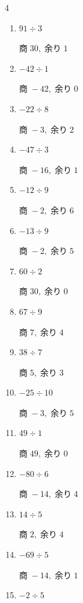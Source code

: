 \begin{multicols}{4}
\begin{enumerate}
        $商\; 4,\; 余り\; 0$

  \item $91 \div 3$

        $商\; 30,\; 余り\; 1$

\columnbreak %

  \item $-42 \div 1$

        $商\; -42,\; 余り\; 0$

  \item $-22 \div 8$

        $商\; -3,\; 余り\; 2$

  \item $-47 \div 3$

        $商\; -16,\; 余り\; 1$

  \item $-12 \div 9$

        $商\; -2,\; 余り\; 6$

  \item $-13 \div 9$

        $商\; -2,\; 余り\; 5$

  \item $60 \div 2$

        $商\; 30,\; 余り\; 0$

  \item $67 \div 9$

        $商\; 7,\; 余り\; 4$

  \item $38 \div 7$

        $商\; 5,\; 余り\; 3$

  \item $-25 \div 10$

        $商\; -3,\; 余り\; 5$

  \item $49 \div 1$

        $商\; 49,\; 余り\; 0$

  \item $-80 \div 6$

        $商\; -14,\; 余り\; 4$

  \item $14 \div 5$

        $商\; 2,\; 余り\; 4$

  \item $-69 \div 5$

        $商\; -14,\; 余り\; 1$

  \item $-2 \div 5$


\end{enumerate}
\end{multicols}
